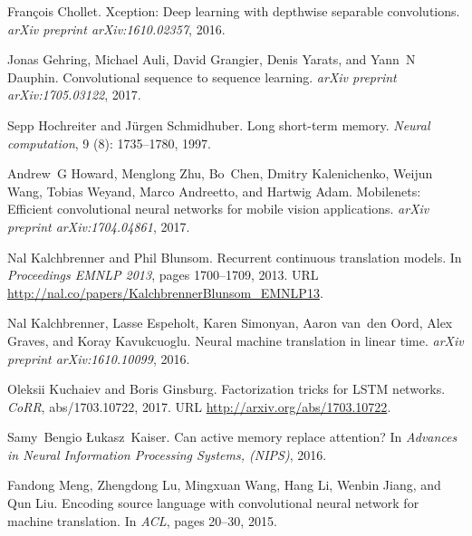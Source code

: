 \documentclass{article}
\begin{document}
\begin{thebibliography}{24}
Fran{\c{c}}ois Chollet.
\newblock Xception: Deep learning with depthwise separable convolutions.
\newblock \emph{arXiv preprint arXiv:1610.02357}, 2016.

Jonas Gehring, Michael Auli, David Grangier, Denis Yarats, and Yann~N Dauphin.
\newblock Convolutional sequence to sequence learning.
\newblock \emph{arXiv preprint arXiv:1705.03122}, 2017.

Sepp Hochreiter and J{\"u}rgen Schmidhuber.
\newblock Long short-term memory.
\newblock \emph{Neural computation}, 9 (8): 1735--1780, 1997.

Andrew~G Howard, Menglong Zhu, Bo~Chen, Dmitry Kalenichenko, Weijun Wang,
  Tobias Weyand, Marco Andreetto, and Hartwig Adam.
\newblock Mobilenets: Efficient convolutional neural networks for mobile vision
  applications.
\newblock \emph{arXiv preprint arXiv:1704.04861}, 2017.

Nal Kalchbrenner and Phil Blunsom.
\newblock Recurrent continuous translation models.
\newblock In \emph{Proceedings {EMNLP} 2013}, pages 1700--1709, 2013.
\newblock URL \url{http://nal.co/papers/KalchbrennerBlunsom_EMNLP13}.

Nal Kalchbrenner, Lasse Espeholt, Karen Simonyan, Aaron van~den Oord, Alex
  Graves, and Koray Kavukcuoglu.
\newblock Neural machine translation in linear time.
\newblock \emph{arXiv preprint arXiv:1610.10099}, 2016.

Oleksii Kuchaiev and Boris Ginsburg.
\newblock Factorization tricks for {LSTM} networks.
\newblock \emph{CoRR}, abs/1703.10722, 2017.
\newblock URL \url{http://arxiv.org/abs/1703.10722}.

Samy~Bengio {\L}ukasz~Kaiser.
\newblock Can active memory replace attention?
\newblock In \emph{Advances in Neural Information Processing Systems,
  ({NIPS})}, 2016.

Fandong Meng, Zhengdong Lu, Mingxuan Wang, Hang Li, Wenbin Jiang, and Qun Liu.
\newblock Encoding source language with convolutional neural network for
  machine translation.
\newblock In \emph{ACL}, pages 20--30, 2015.


\end{thebibliography}
\end{document}
